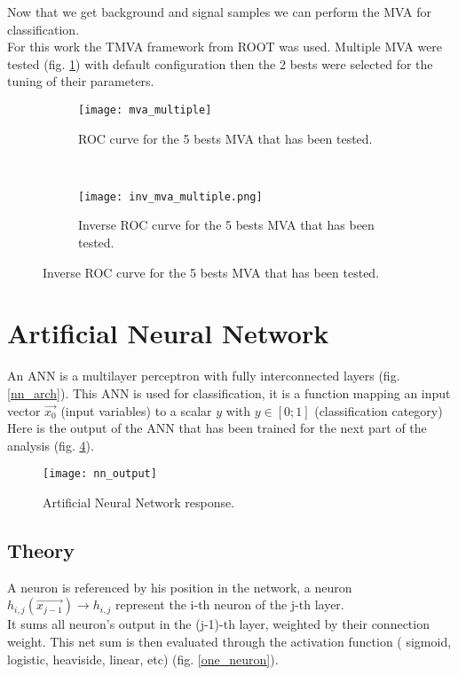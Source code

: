 \label{sec:unchapitre}

Now that we get background and signal samples we can perform the MVA for classification.\\
For this work the TMVA framework from ROOT was used. Multiple MVA were tested (fig. \ref{mva_multiple}) with default configuration then the 2
bests were selected for the tuning of their parameters.\\

\begin{figure}[h!]
\centering
    \begin{subfigure}[h!]{0.4\textwidth}
    \centering
        \texttt{[image: mva\_multiple]}
        \caption{ROC curve for the 5 bests MVA that has been tested.}
        \label{mva_multiple}
  \end{subfigure}
  ~
    \begin{subfigure}[h!]{0.4\textwidth}
    \centering
        \texttt{[image: inv\_mva\_multiple.png]}
        \caption{Inverse ROC curve for the 5 bests MVA that has been tested.}
        \label{inv_mva_multiple}
  \end{subfigure}
\end{figure}


\section{Artificial Neural Network}

An ANN is a multilayer perceptron with fully interconnected layers (fig. \ref{nn_arch}).
This ANN is used for classification, it is a function mapping an input vector $\vec{x_0}$ (input variables) to a scalar $y$ with $y \in [0;1]$ (classification category)\\
Here is the output of the ANN that has been trained for the next part of the analysis (fig. \ref{nn_output}).
\begin{figure}[h!]
\centering
    \texttt{[image: nn\_output]}
    \caption{Artificial Neural Network response.}
    \label{nn_output}
\end{figure}


\subsection{Theory}

A neuron is referenced by his position in the network, a neuron $h_{i,j}(\vec{x_{j-1}}) \rightarrow h_{i,j}$ represent the i-th neuron of the j-th layer.\\
It sums all neuron's output in the (j-1)-th layer, weighted by their connection weight. This net sum is then evaluated through the activation function ( sigmoid, logistic, heaviside, linear, etc) (fig. \ref{one_neuron}).

